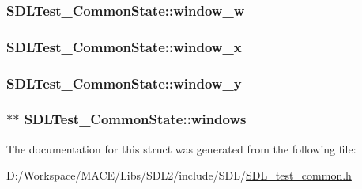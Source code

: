 \subsubsection[{\texorpdfstring{window\+\_\+w}{window_w}}]{ S\+D\+L\+Test\+\_\+\+Common\+State\+::window\+\_\+w}\hypertarget{struct_s_d_l_test___common_state_adc94ae1febd2aa3fa4b190cd0f8cb546}{}\label{struct_s_d_l_test___common_state_adc94ae1febd2aa3fa4b190cd0f8cb546}
\subsubsection[{\texorpdfstring{window\+\_\+x}{window_x}}]{ S\+D\+L\+Test\+\_\+\+Common\+State\+::window\+\_\+x}\hypertarget{struct_s_d_l_test___common_state_a5413ab562164642b3e6ee97ab5d938bf}{}\label{struct_s_d_l_test___common_state_a5413ab562164642b3e6ee97ab5d938bf}
\subsubsection[{\texorpdfstring{window\+\_\+y}{window_y}}]{ S\+D\+L\+Test\+\_\+\+Common\+State\+::window\+\_\+y}\hypertarget{struct_s_d_l_test___common_state_a1fcd61cbe37c2bb563e7b2f1c6853d29}{}\label{struct_s_d_l_test___common_state_a1fcd61cbe37c2bb563e7b2f1c6853d29}
\subsubsection[{\texorpdfstring{windows}{windows}}]{$\ast$$\ast$ S\+D\+L\+Test\+\_\+\+Common\+State\+::windows}\hypertarget{struct_s_d_l_test___common_state_a0a054f0c45eb9d21f9561d701e721106}{}\label{struct_s_d_l_test___common_state_a0a054f0c45eb9d21f9561d701e721106}


The documentation for this struct was generated from the following file\+:\begin{DoxyCompactItemize}
\item 
D\+:/\+Workspace/\+M\+A\+C\+E/\+Libs/\+S\+D\+L2/include/\+S\+D\+L/\hyperlink{_s_d_l__test__common_8h}{S\+D\+L\+\_\+test\+\_\+common.\+h}\end{DoxyCompactItemize}
